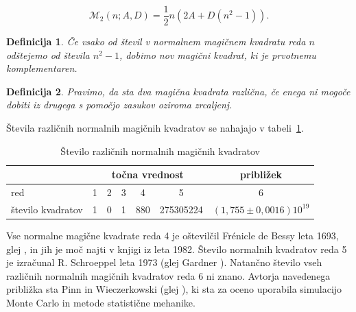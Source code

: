 \documentclass[a4paper,12pt]{article}
\newcommand{\m}{\mathcal{M}}
\newtheorem{definicija}{Definicija}
\begin{document}
\[\m_2(n;A,D)=\frac{1}{2}n(2A + D(n^2 - 1)).\]

\begin{definicija}
      Če vsako od števil v normalnem magičnem kvadratu reda \(n\) odštejemo
      od števila \(n^2 -1\), dobimo nov magični kvadrat, ki je prvotnemu
      \emph{komplementaren}.
\end{definicija}

\begin{definicija}
      Pravimo, da sta dva magična kvadrata \emph{različna}, če enega ni mogoče dobiti
      iz drugega s pomočjo zasukov oziroma zrcaljenj.
\end{definicija}

Števila različnih normalnih magičnih kvadratov se nahajajo v tabeli~\ref{tabele:stevila}.
\begin{table}[ht!]
   \caption{Število različnih normalnih magičnih kvadratov}
   \centering
   \begin{tabular}{lcccccc}\toprule
      & \multicolumn{5}{c}{točna vrednost} & približek \\\midrule
      red& 1& 2& 3& 4& 5& 6 \\
      število kvadratov & 1 & 0 & 1 & 880 & 275305224 & \((1{,}755 \pm 0,0016)10^{19}\) \\\bottomrule
   \end{tabular}
  \label{tabele:stevila}
\end{table}

Vse normalne magične kvadrate reda 4 je oštevilčil Frénicle de Bessy
leta 1693, glej \cite{bessy}, in jih je moč najti v knjigi \cite{berlekamp}
iz leta 1982. Število normalnih kvadratov reda 5 je izračunal
R. Schroeppel leta 1973 (glej Gardner \cite{gardner}).
Natančno število vseh različnih normalnih magičnih kvadratov reda 6 ni znano.
Avtorja navedenega približka sta Pinn in Wieczerkowski (glej \cite{pinn}), ki
sta za oceno uporabila simulacijo Monte Carlo in metode statistične mehanike.


\newpage





\end{document}
